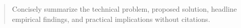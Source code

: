 \begin{abstract}
Concisely summarize the technical problem, proposed solution, headline empirical findings, and practical implications without citations.
\end{abstract}

